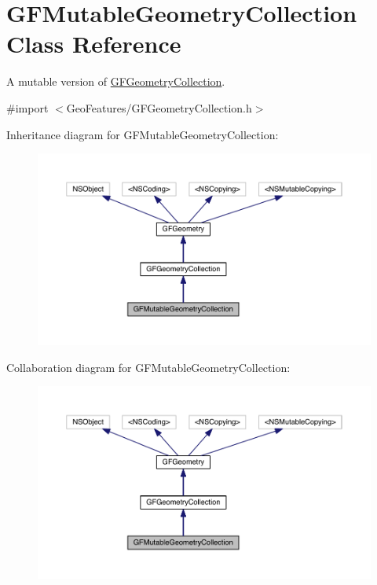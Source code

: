 \hypertarget{interface_g_f_mutable_geometry_collection}{}\section{G\+F\+Mutable\+Geometry\+Collection Class Reference}
\label{interface_g_f_mutable_geometry_collection}


A mutable version of \hyperlink{interface_g_f_geometry_collection}{G\+F\+Geometry\+Collection}.  




{\ttfamily \#import $<$Geo\+Features/\+G\+F\+Geometry\+Collection.\+h$>$}



Inheritance diagram for G\+F\+Mutable\+Geometry\+Collection\+:
\nopagebreak
\begin{figure}[H]
\begin{center}
\leavevmode
\includegraphics[width=350pt]{interface_g_f_mutable_geometry_collection__inherit__graph}
\end{center}
\end{figure}


Collaboration diagram for G\+F\+Mutable\+Geometry\+Collection\+:
\nopagebreak
\begin{figure}[H]
\begin{center}
\leavevmode
\includegraphics[width=350pt]{interface_g_f_mutable_geometry_collection__coll__graph}
\end{center}
\end{figure}
